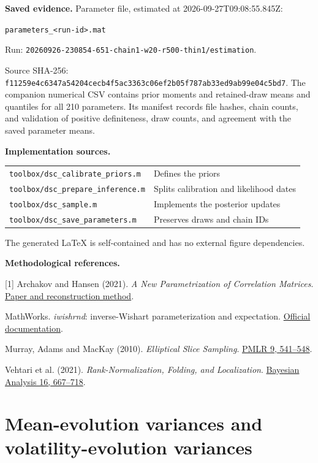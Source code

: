 \documentclass[10pt,a4paper]{article}
\begin{document}
\textbf{Saved evidence.} Parameter file, estimated at 2026-09-27T09:08:55.845Z:
\par{\footnotesize\nolinkurl{parameters_<run-id>.mat}}
\par Run: {\footnotesize\nolinkurl{20260926-230854-651-chain1-w20-r500-thin1/estimation}}.
\par Source SHA-256: {\scriptsize\nolinkurl{f11259e4c6347a54204cecb4f5ac3363c06ef2b05f787ab33ed9ab99e04c5bd7}}.
The companion numerical CSV contains prior moments and retained-draw means and quantiles
for all 210 parameters. Its manifest records file hashes, chain counts, and validation
of positive definiteness, draw counts, and agreement with the saved parameter means.

\textbf{Implementation sources.}\par
{\footnotesize\begin{tabular}{@{}ll@{}}
\nolinkurl{toolbox/dsc_calibrate_priors.m} & Defines the priors\\
\nolinkurl{toolbox/dsc_prepare_inference.m} & Splits calibration and likelihood dates\\
\nolinkurl{toolbox/dsc_sample.m} & Implements the posterior updates\\
\nolinkurl{toolbox/dsc_save_parameters.m} & Preserves draws and chain IDs\\
\end{tabular}}
\par The generated LaTeX is self-contained and has no external figure dependencies.

\textbf{Methodological references.}\par
{\footnotesize
[1] Archakov and Hansen (2021). \emph{A New Parametrization of Correlation Matrices}.
\href{https://arxiv.org/abs/2012.02395}{Paper and reconstruction method}.\par
[2] MathWorks. \emph{iwishrnd}: inverse-Wishart parameterization and expectation.
\href{https://www.mathworks.com/help/stats/iwishrnd.html}{Official documentation}.\par
[3] Murray, Adams and MacKay (2010). \emph{Elliptical Slice Sampling}.
\href{https://proceedings.mlr.press/v9/murray10a.html}{PMLR 9, 541--548}.\par
[4] Vehtari et al. (2021). \emph{Rank-Normalization, Folding, and Localization}.
\href{https://arxiv.org/abs/1903.08008}{Bayesian Analysis 16, 667--718}.
}
\clearpage\section*{Mean-evolution variances and volatility-evolution variances}
\end{document}
